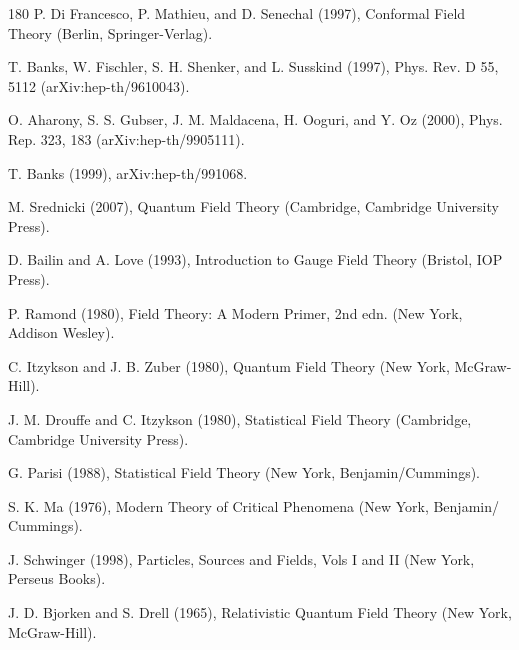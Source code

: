 \begin{thebibliography}{180}
 P. Di Francesco, P. Mathieu, and D. Senechal (1997), Conformal Field Theory (Berlin, Springer-Verlag).

 T. Banks, W. Fischler, S. H. Shenker, and L. Susskind (1997), Phys. Rev. D 55, 5112 (arXiv:hep-th/9610043).

 O. Aharony, S. S. Gubser, J. M. Maldacena, H. Ooguri, and Y. Oz (2000), Phys. Rep. 323, 183 (arXiv:hep-th/9905111).

 T. Banks (1999), arXiv:hep-th/991068.

 M. Srednicki (2007), Quantum Field Theory (Cambridge, Cambridge University Press).

 D. Bailin and A. Love (1993), Introduction to Gauge Field Theory (Bristol, IOP Press).

 P. Ramond (1980), Field Theory: A Modern Primer, 2nd edn. (New York, Addison Wesley).

 C. Itzykson and J. B. Zuber (1980), Quantum Field Theory (New York, McGraw-Hill).

 J. M. Drouffe and C. Itzykson (1980), Statistical Field Theory (Cambridge, Cambridge University Press).

 G. Parisi (1988), Statistical Field Theory (New York, Benjamin/Cummings).

 S. K. Ma (1976), Modern Theory of Critical Phenomena (New York, Benjamin/ Cummings).

 J. Schwinger (1998), Particles, Sources and Fields, Vols I and II (New York, Perseus Books).

 J. D. Bjorken and S. Drell (1965), Relativistic Quantum Field Theory (New York, McGraw-Hill).


\end{thebibliography}
